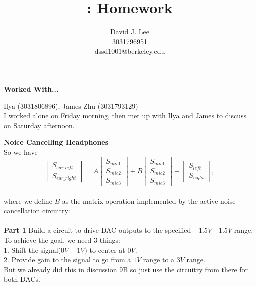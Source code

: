 \documentclass[letter]{article}
\title{\class: Homework \hwn}
\author{David J. Lee\\3031796951\\dssd1001@berkeley.edu}
\newenvironment{menumerate}{\edef\backupindent{\the\parindent}
  \enumerate\setlength{\parindent}{\backupindent}}
  {\endenumerate}
\begin{document}
\maketitle
\thispagestyle{empty}

\begin{menumerate}
    \item \textbf{Worked With...}
    
    Ilya (3031806896), James Zhu (3031793129)\\
    I worked alone on Friday morning, then met up with Ilya and James to discuss on Saturday afternoon.
    
    \newpage
    \item \textbf{Noice Cancelling Headphones}\\
    So we have
    \begin{equation*}
        \begin{bmatrix}
            S_{ear\_left}\\S_{ear\_right}
        \end{bmatrix}
        =
        A\begin{bmatrix}
            S_{mic1}\\S_{mic2}\\S_{mic3}
        \end{bmatrix}
        +
        B\begin{bmatrix}
            S_{mic1}\\S_{mic2}\\S_{mic3}
        \end{bmatrix}
        +
        \begin{bmatrix}
            S_{left}\\S_{right}
        \end{bmatrix},
    \end{equation*}\\
    where we define $B$ as the matrix operation implemented by the active noise cancellation circuitry:\\
    \\
    \textbf{Part 1}
    Build a circuit to drive DAC outputs to the specified $-1.5V$ - $1.5V$ range.\\
    To achieve the goal, we need 3 things:\\
    1. Shift the signal($0V-1V$) to center at $0V$.\\
    2. Provide gain to the signal to go from a $1V$ range to a $3V$ range.\\
    But we already did this in discussion 9B so just use the circuitry from there for both DACs.\\

\end{menumerate}
\end{document}
